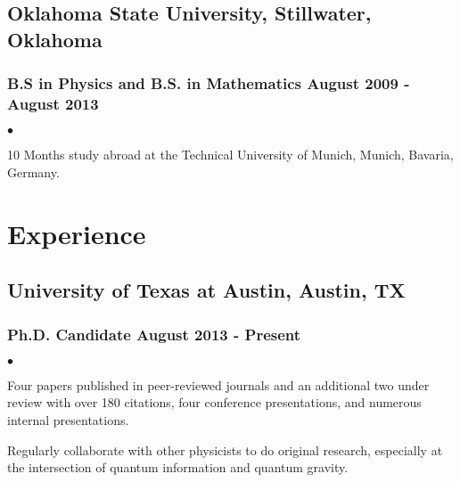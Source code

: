 \documentclass[letterpaper]{article}
\renewenvironment{itemize}{
  \begin{list}{$\bullet$}{
    \setlength{\itemsep}{0em}
    \setlength{\parskip}{0em}
    \setlength{\parsep}{0em} 
    \setlength{\topsep}{0em} 
  }
}{
  \end{list}
}
\begin{document}
\subsection*{Oklahoma State University, Stillwater, Oklahoma}
\subsubsection*{B.S in Physics and B.S. in Mathematics \hfill August 2009 - August 2013}

\begin{itemize}
\item 10 Months study abroad at the Technical University of Munich, Munich, Bavaria, Germany.
\end{itemize}

\section*{Experience}

\subsection*{University of Texas at Austin, Austin, TX} 
\subsubsection*{Ph.D. Candidate \hfill August 2013 - Present}
    \begin{itemize}
    
        \item Four papers published in peer-reviewed journals and an additional two under review with over 180 citations, four conference presentations, and numerous internal presentations.
        \item Regularly collaborate with other physicists to do original research, especially at the intersection of quantum information and quantum gravity.
        
    \end{itemize}
    
\end{document}
